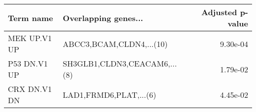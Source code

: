 \begin{tabular}{llr}
\toprule
   Term name &         Overlapping genes... &  Adjusted p-value \\
\midrule
MEK UP.V1 UP &     ABCC3,BCAM,CLDN4,...(10) &          9.30e-04 \\
P53 DN.V1 UP & SH3GLB1,CLDN3,CEACAM6,...(8) &          1.79e-02 \\
CRX DN.V1 DN &       LAD1,FRMD6,PLAT,...(6) &          4.45e-02 \\
\bottomrule
\end{tabular}
